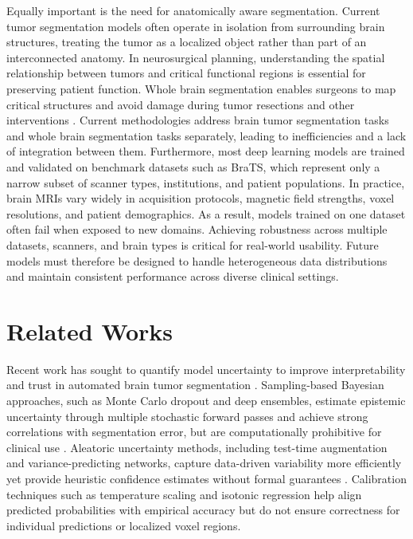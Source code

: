 \documentclass[11pt,letterpaper]{article}
\begin{document}
Equally important is the need for anatomically aware segmentation. Current tumor segmentation models often operate in isolation from surrounding brain structures, treating the tumor as a localized object rather than part of an interconnected anatomy. In neurosurgical planning, understanding the spatial relationship between tumors and critical functional regions is essential for preserving patient function. Whole brain segmentation enables surgeons to map critical structures and avoid damage during tumor resections and other interventions \cite{desikan2006}. Current methodologies address brain tumor segmentation tasks and whole brain segmentation tasks separately, leading to inefficiencies and a lack of integration between them. Furthermore, most deep learning models are trained and validated on benchmark datasets such as BraTS, which represent only a narrow subset of scanner types, institutions, and patient populations. In practice, brain MRIs vary widely in acquisition protocols, magnetic field strengths, voxel resolutions, and patient demographics. As a result, models trained on one dataset often fail when exposed to new domains. Achieving robustness across multiple datasets, scanners, and brain types is critical for real-world usability. Future models must therefore be designed to handle heterogeneous data distributions and maintain consistent performance across diverse clinical settings.
\section{Related Works}
Recent work has sought to quantify model uncertainty to improve interpretability and trust in automated brain tumor segmentation \cite{mehta2022qubrats,jungo2020analyzing}. Sampling-based Bayesian approaches, such as Monte Carlo dropout and deep ensembles, estimate epistemic uncertainty through multiple stochastic forward passes and achieve strong correlations with segmentation error, but are computationally prohibitive for clinical use \cite{wang2019aleatoric}. Aleatoric uncertainty methods, including test-time augmentation and variance-predicting networks, capture data-driven variability more efficiently yet provide heuristic confidence estimates without formal guarantees \cite{wang2019aleatoric}. Calibration techniques such as temperature scaling and isotonic regression help align predicted probabilities with empirical accuracy but do not ensure correctness for individual predictions or localized voxel regions.
\end{document}
